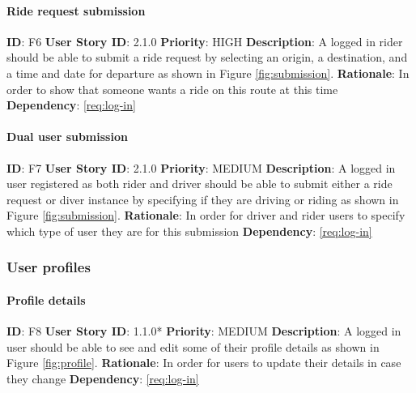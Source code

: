 \documentclass{article}
\begin{document}
\paragraph{Ride request submission}\label{req:rideRequest}
\textbf{ID}: F6\newline
\textbf{User Story ID}: 2.1.0\newline
\textbf{Priority}: HIGH\newline
\textbf{Description}: A logged in rider should be able to submit a ride request by selecting an origin, a destination, and a time and date for departure as shown in Figure \ref{fig:submission}. \newline
\textbf{Rationale}: In order to show that someone wants a ride on this route at this time\newline
\textbf{Dependency}: \ref{req:log-in}\newline

\paragraph{Dual user submission}\label{req:dualSubmission}
\textbf{ID}: F7\newline
\textbf{User Story ID}: 2.1.0\newline
\textbf{Priority}: MEDIUM\newline
\textbf{Description}: A logged in user registered as both rider and driver should be able to submit either a ride request or diver instance by specifying if they are driving or riding as shown in Figure \ref{fig:submission}. \newline
\textbf{Rationale}: In order for driver and rider users to specify which type of user they are for this submission\newline
\textbf{Dependency}: \ref{req:log-in}\newline

\subsubsection{User profiles}

\paragraph{Profile details}\label{req:profileDetails}
\textbf{ID}: F8\newline
\textbf{User Story ID}: 1.1.0*\newline
\textbf{Priority}: MEDIUM\newline
\textbf{Description}: A logged in user should be able to see and edit some of their profile details as shown in Figure \ref{fig:profile}. \newline
\textbf{Rationale}: In order for users to update their details in case they change\newline
\textbf{Dependency}: \ref{req:log-in}\newline
\end{document}
